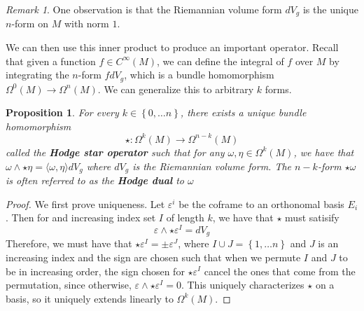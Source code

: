 \documentclass[psamsfonts]{amsart}
\newtheorem{prop}[thm]{Proposition}
\theoremstyle{definition}
\theoremstyle{remark}
\newtheorem*{rem*}{Remark}
\newcommand{\ib}[1]{\textbf{\textit{#1}}}
\newcommand{\set}[1]{\left\lbrace#1 \right\rbrace}
\begin{document}
\begin{rem*}
One observation is that the Riemannian volume form $dV_g$  is the unique $n$-form on $M$ with norm $1$.
\end{rem*}
We can then use this inner product to produce an important operator. Recall that given a function $f \in C^\infty(M)$, we can define the integral of $f$ over $M$ by integrating the $n$-form $fdV_g$, which is a bundle homomorphism $\Omega^0(M) \to \Omega^n(M)$. We can generalize this to arbitrary $k$ forms.
\begin{prop}
For every $k \in \set{0, \ldots  n}$, there exists a unique bundle homomorphism
$$\star: \Omega^{k}(M) \to \Omega^{n-k}(M)$$
called the \ib{Hodge star operator} such that for any $\omega, \eta  \in \Omega^k(M)$, we have that $\omega \wedge \star\eta = \langle \omega, \eta \rangle dV_g$ where $dV_g$ is the Riemannian volume form. The $n-k$-form $\star \omega$ is often referred to as the \ib{Hodge dual} to $\omega$
\end{prop}
\begin{proof}
We first prove uniqueness. Let $\varepsilon^i$  be the coframe to an orthonomal basis $E_i$. Then for and increasing index set $I$ of length $k$, we have that $\star$ must satisify 
$$\varepsilon \wedge \star \varepsilon^I = dV_g$$
Therefore, we must have that $\star \varepsilon^I = \pm \varepsilon^J$, where $I \cup J = \set{1, \ldots n}$ and $J$ is an increasing index and the sign are chosen such that when we permute $I$ and $J$ to be in increasing order, the sign chosen for $\star \varepsilon^I$ cancel the ones that come from the permutation, since otherwise, $\varepsilon \wedge \star \varepsilon^I = 0$. This uniquely characterizes $\star$ on a basis, so it uniquely extends linearly to $\Omega^k(M)$.
\end{proof}
\end{document}

